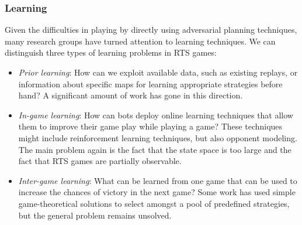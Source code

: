 \documentclass{llncs}
\begin{document}
\subsubsection{Learning}
Given  the  difficulties  in  playing  by  directly  using
adversarial  planning techniques,  many  research  groups have  turned
attention to  learning techniques. We  can distinguish three  types of
learning problems in RTS games:
\begin{itemize}
\item {\em Prior learning}: How can we exploit available data, such as
  existing replays,  or information  about specific maps  for learning
  appropriate strategies before hand? A significant amount of work has
  gone in this
  direction.%
\item  {\em In-game  learning}: How  can bots  deploy online  learning
  techniques that allow them to  improve their game play while playing
  a  game?  These  techniques  might  include  reinforcement  learning
  techniques, but  also opponent modeling.  The main problem  again is
  the fact  that the state  space is too large  and the fact  that RTS
  games are partially observable.
\item {\em  Inter-game learning}:  What can be  learned from  one game
  that can  be used  to increase  the chances of  victory in  the next
  game? Some work has used simple game-theoretical solutions to select
  amongst a  pool of  predefined strategies,  but the  general problem
  remains unsolved.
\end{itemize}

\end{document}
